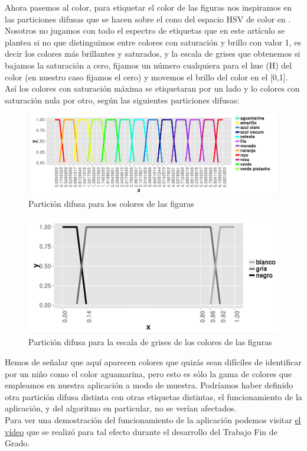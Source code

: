 \documentclass[10pt,a4paper]{article}
\begin{document}
Ahora pasemos al color, para etiquetar el color de las figuras nos inspiramos en las particiones difusas que se hacen sobre el cono del espacio HSV de color en \cite{artDaniHSV}. Nosotros no jugamos con todo el espectro de etiquetas que en este artículo se plantea si no que distinguimos entre colores con saturación y brillo con valor 1, es decir los colores más brillantes y saturados, y la escala de grises que obtenemos si bajamos la saturación a cero, fijamos un número cualquiera para el hue (H) del color (en nuestro caso fijamos el cero) y movemos el brillo del color en el [0,1]. Así los colores con saturación máxima se etiquetaran por un lado y lo colores con saturación nula por otro, según las siguientes particiones difusas:\\

\begin{figure}[H]
\centering
\includegraphics[width = \textwidth]{img/partitionColor.png}
\caption{Partición difusa para los colores de las figuras}
\end{figure}

\begin{figure}[H]
\centering
\includegraphics[width = \textwidth]{img/partitionGrey.png}
\caption{Partición difusa para la escala de grises de los colores de las figuras}
\end{figure}

Hemos de señalar que aquí aparecen colores que quizás sean difíciles de identificar por un niño como el color aguamarina, pero esto es sólo la gama de colores que empleamos en nuestra aplicación a modo de muestra. Podríamos haber definido otra partición difusa distinta con otras etiquetas distintas, el funcionamiento de la aplicación, y del algoritmo en particular, no se verían afectados.\\

Para ver una demostración del funcionamiento de la aplicación podemos visitar \href{https://www.youtube.com/watch?v=sfQNCcHsYu8}{el vídeo} que se realizó para tal efecto durante el desarrollo del Trabajo Fin de Grado.
\newpage

\nocite{*}


\end{document}
